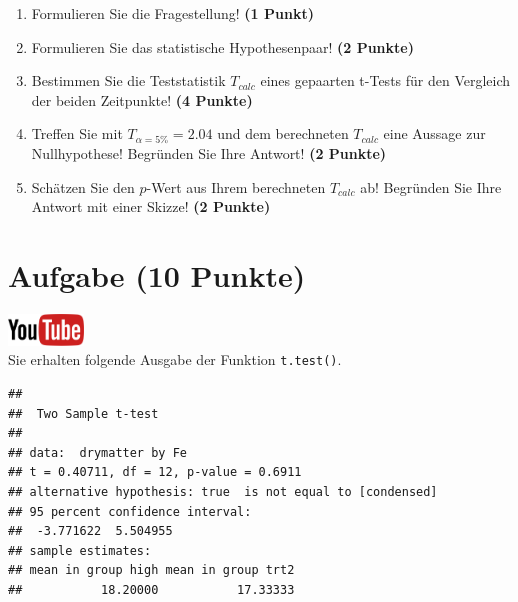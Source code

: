 \documentclass[a4paper, 9pt]{scrartcl}\usepackage[]{graphicx}\usepackage[]{xcolor}
\makeatletter
\newenvironment{kframe}{%
 \def\at@end@of@kframe{}%
 \ifinner\ifhmode%
  \def\at@end@of@kframe{\end{minipage}}%
  \begin{minipage}{\columnwidth}%
 \fi\fi%
 \def\FrameCommand##1{\hskip\@totalleftmargin \hskip-\fboxsep
 \colorbox{shadecolor}{##1}\hskip-\fboxsep
     \hskip-\linewidth \hskip-\@totalleftmargin \hskip\columnwidth}%
 \MakeFramed {\advance\hsize-\width
   \@totalleftmargin\z@ \linewidth\hsize
   \@setminipage}}%
 {\par\unskip\endMakeFramed%
 \at@end@of@kframe}
\newenvironment{knitrout}{}{} %
\makeatother
\begin{document}
\begin{enumerate}
\item Formulieren Sie die Fragestellung! \textbf{(1 Punkt)}
\item Formulieren Sie das statistische Hypothesenpaar! \textbf{(2
    Punkte)}
\item Bestimmen Sie die Teststatistik $T_{calc}$ eines gepaarten t-Tests f{\"u}r den
  Vergleich der beiden Zeitpunkte! \textbf{(4 Punkte)}
\item Treffen Sie mit $T_{\alpha = 5\%} = 2.04$ und dem berechneten $T_{calc}$ eine Aussage
  zur Nullhypothese! Begr{\"u}nden Sie Ihre Antwort! \textbf{(2 Punkte)}
\item Sch{\"a}tzen Sie den $p$-Wert aus Ihrem berechneten $T_{calc}$ ab!
  Begr{\"u}nden Sie Ihre Antwort mit einer Skizze! \textbf{(2
    Punkte)}
\end{enumerate} 
\clearpage

\section{Aufgabe \hfill (10 Punkte)}

\hfill\href{https://youtu.be/exDo7AyHl4Q}{\includegraphics[width =
  2cm]{img/youtube}}\\[1Ex]

Sie erhalten folgende \Rlogo Ausgabe der Funktion \texttt{t.test()}.

\begin{knitrout}
\color{fgcolor}\begin{kframe}
\begin{verbatim}
## 
## 	Two Sample t-test
## 
## data:  drymatter by Fe
## t = 0.40711, df = 12, p-value = 0.6911
## alternative hypothesis: true  is not equal to [condensed]
## 95 percent confidence interval:
##  -3.771622  5.504955
## sample estimates:
## mean in group high mean in group trt2 
##           18.20000           17.33333
\end{verbatim}
\end{kframe}
\end{knitrout}
\end{document}
